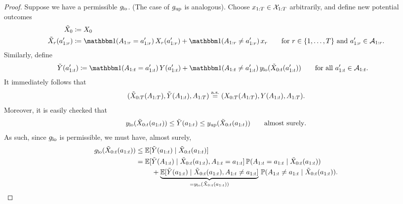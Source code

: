\begin{proof}
    Suppose we have a permissible $g_{\mathrm{lo}}$.
    (The case of $g_{\mathrm{up}}$ is analogous).
    Choose $x_{1:T} \in \mathcal{X}_{1:T}$ arbitrarily, and define new potential outcomes
    \begin{align*}
        \tilde{\X}_0 &\coloneqq \X_0 \\
        \tilde{\X}_r(\ax_{1:r}') &\coloneqq %
            \ind(\A_{1:r} = \ax_{1:r}') \, \X_{r}(\ax_{1:r}') + \ind(\A_{1:r} \neq \ax_{1:r}') \, \xx_{r} \qquad \text{for $r \in \{1, \ldots, \T\}$ and $\ax_{1:r}' \in \Aspace_{1:r}$}.
    \end{align*}
    Similarly, define
    \begin{align*}
        \tilde{\Y}(\ax_{1:\tx}') &\coloneqq \ind(\A_{1:\tx} = \ax_{1:\tx}') \, \Y(\ax_{1:\tx}') + \ind(\A_{1:\tx} \neq \ax_{1:\tx}') \, \ylo(\tilde{\X}_{0:\tx}(\ax_{1:\tx}')) \qquad \text{for all $\ax_{1:\tx}' \in \Aspace_{1:\tx}$}.
    \end{align*}
    It immediately follows that
    \[
        (\tilde{X}_{0:T}(A_{1:T}), \tilde{Y}(A_{1:t}), A_{1:T}) \overset{\mathrm{a.s.}}{=} (X_{0:T}(A_{1:T}), Y(A_{1:t}), A_{1:T}).
    \]
    Moreover, it is easily checked that
    \[
        y_{\mathrm{lo}}(\tilde{X}_{0:t}(a_{1:t})) \leq \tilde{Y}(a_{1:t}) \leq y_{\mathrm{up}}(\tilde{X}_{0:t}(a_{1:t})) \qquad \text{almost surely}.
    \]
    As such, since $g_{\mathrm{lo}}$ is permissible, we must have, almost surely,
    \begin{align}
        \lo{\gx}(\tilde{\X}_{0:\tx}(\ax_{1:\tx})) &\leq \E[\tilde{\Y}(\ax_{1:\tx}) \mid \tilde{\X}_{0:\tx}(\ax_{1:\tx})] \notag \\
         &= \begin{multlined}[t]
            \E[\tilde{\Y}(\A_{1:\tx}) \mid \tilde{\X}_{0:\tx}(\ax_{1:\tx}), \A_{1:\tx} = \ax_{1:\tx}] \, \Prob(\A_{1:\tx} = \ax_{1:\tx} \mid \tilde{\X}_{0:\tx}(\ax_{1:\tx})) \\
                + \underbrace{\E[\tilde{\Y}(\ax_{1:\tx}) \mid \tilde{\X}_{0:\tx}(\ax_{1:\tx}), \A_{1:\tx} \neq \ax_{1:\tx}]}_{=\ylo(\tilde{\X}_{0:\tx}(\ax_{1:\tx}))} \, \Prob(\A_{1:\tx} \neq \ax_{1:\tx} \mid \tilde{\X}_{0:\tx}(\ax_{1:\tx})).
        \end{multlined} \label{eq:no-continuous-bounds-proof-convex-combination}

\end{align}
\end{proof}
